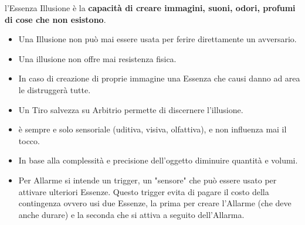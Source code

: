 \documentclass[a4paper,11pt,twoside,openany]{book}
\begin{document}
\label{essenza-illusione---magnetismo}

l'Essenza Illusione è la \textbf{capacità di creare immagini, suoni,
odori, profumi di cose che non esistono}.
\begin{itemize}
\item 
Una Illusione non può mai essere usata per ferire direttamente un avversario. 
\item 
Una illusione non offre mai resistenza fisica. 
\item 
In caso di creazione di proprie immagine una Essenza che causi danno ad area le distruggerà tutte. 
\item 
Un Tiro salvezza su Arbitrio permette di discernere l'illusione. 
\item 
è sempre e solo sensoriale (uditiva, visiva, olfattiva), e non influenza mai il tocco. 
\item 
In base alla complessità e precisione dell'oggetto diminuire quantità e volumi. 
\item 
Per Allarme si intende un trigger, un "sensore" che può essere usato per attivare ulteriori Essenze. Questo trigger evita di pagare il costo della contingenza ovvero usi due Essenze, la prima per creare l'Allarme (che deve anche durare) e la seconda che si attiva a seguito
dell'Allarma. 
\end{itemize}

\bigskip
\end{document}

